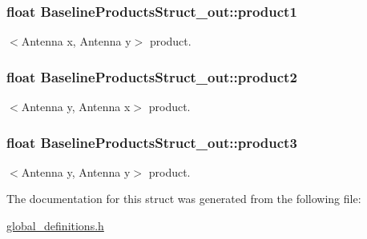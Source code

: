 \subsubsection[{\texorpdfstring{product1}{product1}}]{\setlength{\rightskip}{0pt plus 5cm}float Baseline\+Products\+Struct\+\_\+out\+::product1}\hypertarget{struct_baseline_products_struct__out_a35670336bbaf3d077c55f9550f4b895c}{}\label{struct_baseline_products_struct__out_a35670336bbaf3d077c55f9550f4b895c}
$<$Antenna x, Antenna y$>$ product. 
\subsubsection[{\texorpdfstring{product2}{product2}}]{\setlength{\rightskip}{0pt plus 5cm}float Baseline\+Products\+Struct\+\_\+out\+::product2}\hypertarget{struct_baseline_products_struct__out_a4cd6dd3eea5e3c23ab91847dc9d30922}{}\label{struct_baseline_products_struct__out_a4cd6dd3eea5e3c23ab91847dc9d30922}
$<$Antenna y, Antenna x$>$ product. 
\subsubsection[{\texorpdfstring{product3}{product3}}]{\setlength{\rightskip}{0pt plus 5cm}float Baseline\+Products\+Struct\+\_\+out\+::product3}\hypertarget{struct_baseline_products_struct__out_a3bbe18fde5c12745f9814333c3bb4c3f}{}\label{struct_baseline_products_struct__out_a3bbe18fde5c12745f9814333c3bb4c3f}
$<$Antenna y, Antenna y$>$ product. 

The documentation for this struct was generated from the following file\+:\begin{DoxyCompactItemize}
\item 
\hyperlink{global__definitions_8h}{global\+\_\+definitions.\+h}\end{DoxyCompactItemize}
